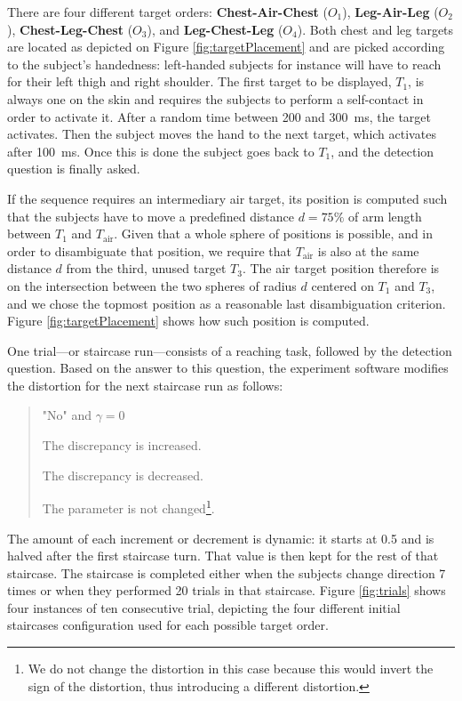 There are four different target orders: \textbf{Chest-Air-Chest} ($O_1$), \textbf{Leg-Air-Leg} ($O_2$), \textbf{Chest-Leg-Chest} ($O_3$), and \textbf{Leg-Chest-Leg} ($O_4$). Both chest and leg targets are located as depicted on Figure \ref{fig:targetPlacement} and are picked according to the subject's handedness: left-handed subjects for instance will have to reach for their left thigh and right shoulder. The first target to be displayed, $T_1$, is always one on the skin and requires the subjects to perform a self-contact in order to activate it. After a random time between \num{200} and \SI{300}{\milli\second}, the target activates. Then the subject moves the hand to the next target, which activates after \SI{100}{\milli\second}. Once this is done the subject goes back to $T_1$, and the detection question is finally asked.

If the sequence requires an intermediary air target, its position is computed such that the subjects have to move a predefined distance $d = 75\%$ of arm length between $T_1$ and $T_{\text{air}}$. Given that a whole sphere of positions is possible, and in order to disambiguate that position, we require that $T_\text{air}$ is also at the same distance $d$ from the third, unused target $T_3$. The air target position therefore is on the intersection between the two spheres of radius $d$ centered on $T_1$ and $T_3$, and we chose the topmost position as a reasonable last disambiguation criterion. Figure \ref{fig:targetPlacement} shows how such position is computed.

One trial---or staircase run---consists of a reaching task, followed by the detection question. Based on the answer to this question, the experiment software modifies the distortion for the next staircase run as follows:
\begin{quote}
    \begin{labeling}{"No" and $\gamma = 0$}
      \item ["Yes"] The discrepancy is increased.
      \item ["No" and $\gamma \neq 0$] The discrepancy is decreased.
      \item ["No" and $\gamma = 0$] The parameter is not changed\footnote{We do not change the distortion in this case because this would invert the sign of the distortion, thus introducing a different distortion.}.
    \end{labeling}
\end{quote}

The amount of each increment or decrement is dynamic: it starts at \num{0.5} and is halved after the first staircase turn. That value is then kept for the rest of that staircase. The staircase is completed either when the subjects change direction 7 times or when they performed 20 trials in that staircase. Figure \ref{fig:trials} shows four instances of ten consecutive trial, depicting the four different initial staircases configuration used for each possible target order.

